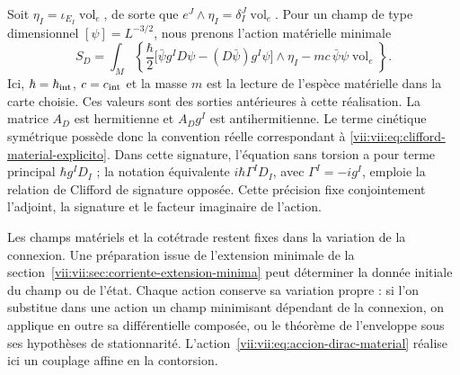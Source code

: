 Soit \(\eta_I=\iota_{E_I}\operatorname{vol}_e\), de sorte que \(e^J\wedge\eta_I=\delta_I^J\operatorname{vol}_e\). Pour un champ de type dimensionnel \([\psi]=L^{-3/2}\), nous prenons l'action matérielle minimale
\begin{equation}
 S_D=\int_M\left\{
 \frac{\hbar}{2}
 \bigl[\bar\psi g^I D\psi-(D\bar\psi)g^I\psi\bigr]\wedge\eta_I
 -mc\,\bar\psi\psi\operatorname{vol}_e\right\}.
 \label{vii:vii:eq:accion-dirac-material}
\end{equation}
Ici, \(\hbar=\hbar_{\rm int}\), \(c=c_{\rm int}\) et la masse \(m\) est la lecture de l'espèce matérielle dans la carte choisie. Ces valeurs sont des sorties antérieures à cette réalisation. La matrice \(A_D\) est hermitienne et \(A_Dg^I\) est antihermitienne. Le terme cinétique symétrique possède donc la convention réelle correspondant à \eqref{vii:vii:eq:clifford-material-explicito}. Dans cette signature, l'équation sans torsion a pour terme principal \(\hbar g^I D_I\) ; la notation équivalente \(i\hbar\Gamma^I D_I\), avec \(\Gamma^I=-i g^I\), emploie la relation de Clifford de signature opposée. Cette précision fixe conjointement l'adjoint, la signature et le facteur imaginaire de l'action.

Les champs matériels et la cotétrade restent fixes dans la variation
de la connexion. Une préparation issue de l'extension minimale de
la section~\ref{vii:vii:sec:corriente-extension-minima} peut déterminer
la donnée initiale du champ ou de l'état. Chaque action conserve sa
variation propre : si l'on substitue dans une action un champ minimisant
dépendant de la connexion, on applique en outre sa différentielle composée,
ou le théorème de l'enveloppe sous ses hypothèses de stationnarité.
L'action~\eqref{vii:vii:eq:accion-dirac-material} réalise ici un
couplage affine en la contorsion.


